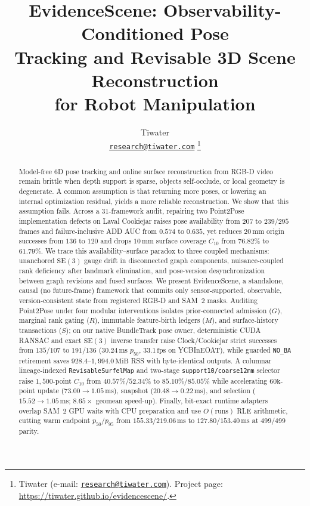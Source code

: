 \documentclass[10pt,journal]{IEEEtran}
\title{EvidenceScene: Observability-Conditioned Pose\\ Tracking and Revisable 3D Scene Reconstruction\\ for Robot Manipulation}
\author{Tiwater\\
{\normalsize\href{mailto:research@tiwater.com}{\texttt{research@tiwater.com}}}%
\thanks{Tiwater (e-mail: \href{mailto:research@tiwater.com}{\texttt{research@tiwater.com}}). Project page: \url{https://tiwater.github.io/evidencescene/}.}}
\begin{document}
\sloppy
\maketitle

\begin{abstract}\normalfont
Model-free 6D pose tracking and online surface reconstruction from RGB-D video remain brittle when depth support is sparse, objects self-occlude, or local geometry is degenerate. A common assumption is that returning more poses, or lowering an internal optimization residual, yields a more reliable reconstruction. We show that this assumption fails. Across a 31-framework audit, repairing two Point2Pose implementation defects on Laval Cookiejar raises pose availability from $207$ to $239/295$ frames and failure-inclusive ADD AUC from $0.574$ to $0.635$, yet reduces $20\,\mathrm{mm}$ origin successes from $136$ to $120$ and drops $10\,\mathrm{mm}$ surface coverage $C_{10}$ from $76.82\%$ to $61.79\%$. We trace this availability--surface paradox to three coupled mechanisms: unanchored $\mathrm{SE}(3)$ gauge drift in disconnected graph components, nuisance-coupled rank deficiency after landmark elimination, and pose-version desynchronization between graph revisions and fused surfaces. We present EvidenceScene, a standalone, causal (no future-frame) framework that commits only sensor-supported, observable, version-consistent state from registered RGB-D and SAM~2 masks. Auditing Point2Pose under four modular interventions isolates prior-connected admission ($G$), marginal rank gating ($R$), immutable feature-birth ledgers ($M$), and surface-history transactions ($S$); on our native BundleTrack pose owner, deterministic CUDA RANSAC and exact $\mathrm{SE}(3)$ inverse transfer raise Clock/Cookiejar strict successes from $135/107$ to $191/136$ ($30.24\,\mathrm{ms}$ $p_{50}$, $33.1\,\mathrm{fps}$ on YCBInEOAT), while guarded \texttt{NO\_BA} retirement saves $928.4$--$1{,}994.0\,\mathrm{MiB}$ RSS with byte-identical outputs. A columnar lineage-indexed \texttt{RevisableSurfelMap} and two-stage \texttt{support10/coarse12mm} selector raise $1{,}500$-point $C_{10}$ from $40.57\%/52.34\%$ to $85.10\%/85.05\%$ while accelerating $60\mathrm{k}$-point update ($73.00\to 1.05\,\mathrm{ms}$), snapshot ($20.48\to 0.22\,\mathrm{ms}$), and selection ($15.52\to 1.05\,\mathrm{ms}$; $8.65\times$ geomean speed-up). Finally, bit-exact runtime adapters overlap SAM~2 GPU waits with CPU preparation and use $O(\text{runs})$ RLE arithmetic, cutting warm endpoint $p_{50}/p_{95}$ from $155.33/219.06\,\mathrm{ms}$ to $127.80/153.40\,\mathrm{ms}$ at $499/499$ parity.
\end{abstract}
\end{document}
